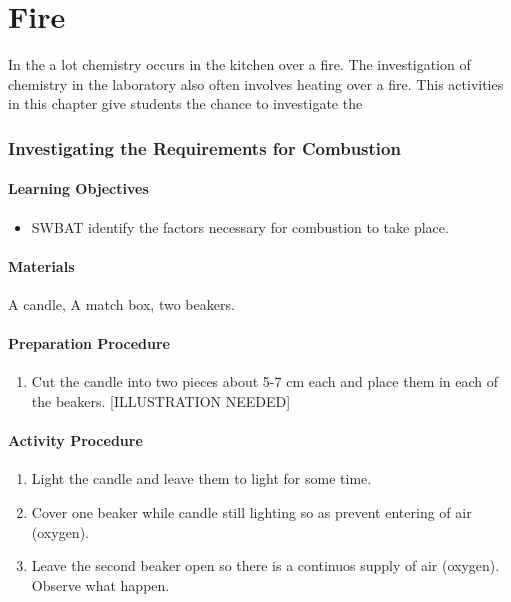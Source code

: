 \chapter{Fire}

In the a lot chemistry occurs in the kitchen over a fire. The investigation of chemistry in the laboratory also often involves heating over a fire. This activities in this chapter give students the chance to investigate the 

\subsection{Investigating the Requirements for Combustion}

\subsubsection*{Learning Objectives}
\begin{itemize}
\item{SWBAT identify the factors necessary for combustion to take place.}
\end{itemize}


\subsubsection*{Materials}
A candle, A match box, two beakers.

\subsubsection*{Preparation Procedure}
\begin{enumerate}
\item{Cut the candle into two pieces about 5-7 cm each and place them in each of the beakers. [ILLUSTRATION NEEDED]}
\end{enumerate}

\subsubsection*{Activity Procedure}
\begin{enumerate}
\item{Light the candle and leave them to light for some time.}
\item{Cover one beaker while candle still lighting so as prevent entering of air (oxygen).}
\item{Leave the second beaker open so there is a continuos supply of air (oxygen). Observe what happen.}
\end{enumerate}

